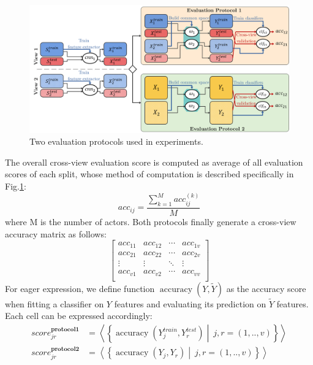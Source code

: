     \begin{figure}[htbp]
      \centering
      \includegraphics[width=1\linewidth]{figs/protocol.png}
      \caption{Two evaluation protocols used in experiments.}
      \label{Fig:ep}
    \end{figure}
    The overall cross-view evaluation score is computed as average of all evaluation scores of each split, whose method of computation is described specifically in Fig.\ref{Fig:ep}:
    \begin{equation}
        {acc}_{ij} = \frac{\sum_{k=1}^M {acc}^{(k)}_{ij}}{M}
    \end{equation}
    where M is the number of actors. Both protocols finally generate a cross-view accuracy matrix as follows:
    \begin{equation}
        \left[\begin{matrix}{acc}_{11}&{acc}_{12}&\cdots&{acc}_{1v}\\{acc}_{21}&{acc}_{22}&\cdots&{acc}_{2v}\\\vdots&\vdots&\ddots&\vdots\\{acc}_{v1}&{acc}_{v2}&\cdots&{acc}_{vv}\\\end{matrix}\right]
        \label{eq:multiview_scores}
    \end{equation}
    For eager expression, we define function $\operatorname{accuracy}\left(Y, \tilde{Y}\right)$ as the accuracy score when fitting a classifier on $Y$ features and evaluating its prediction on $\tilde{Y}$ features. Each cell can be expressed accordingly:
    \begin{align}
        {score}_{jr}^{\boldsymbol{protocol 1}} & =\left<\left\{\operatorname{accuracy}\left(Y_j^{train},Y_r^{test}\right)\middle|\ j,r=(1,..,v)\right\}\right> \\
        {score}_{jr}^{\boldsymbol{protocol 2}} & =\left<\left\{\operatorname{accuracy}\left(Y_j,Y_r\right)\middle|\ j,r=(1,..,v)\right\}\right>
    \end{align}


